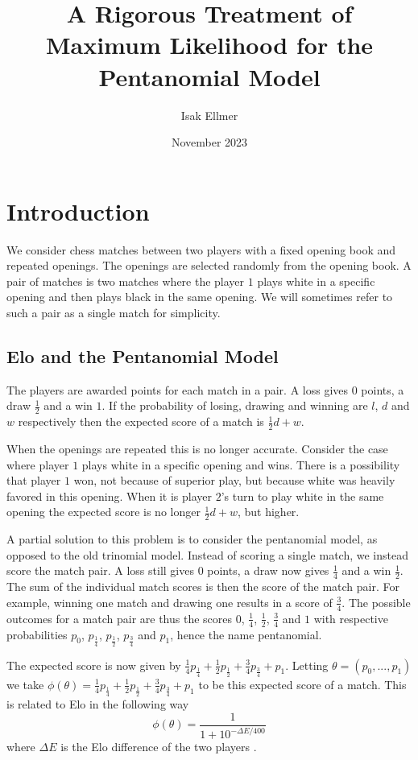 \documentclass{article}
\title{A Rigorous Treatment of Maximum Likelihood for the Pentanomial Model}
\author{Isak Ellmer}
\date{November 2023}
\theoremstyle{plain}
\theoremstyle{definition}
\begin{document}
\maketitle

\section{Introduction}
We consider chess matches between two players with a fixed opening book and repeated openings.
The openings are selected randomly from the opening book. A pair of matches is two matches where
the player $1$ plays white in a specific opening and then plays black in the same opening.
We will sometimes refer to such a pair as a single match for simplicity.

\subsection{Elo and the Pentanomial Model}
The players are awarded points for each match in a pair. A loss gives $0$ points,
a draw $\frac12$ and a win $1$. If the probability of losing, drawing and winning
are $l$, $d$ and $w$ respectively then the expected score of a match is $\frac12d+w$.

When the openings are repeated this is no longer accurate. Consider the case where
player $1$ plays white in a specific opening and wins. There is a possibility that
player $1$ won, not because of superior play, but because white was heavily favored
in this opening. When it is player $2$'s turn to play white in the same opening
the expected score is no longer $\frac12d+w$, but higher.

A partial solution to this problem is to consider the pentanomial model, as opposed to the
old trinomial model. Instead of
scoring a single match, we instead score the match pair. A loss still gives $0$ points,
a draw now gives $\frac14$ and a win $\frac12$. The sum of the individual match scores
is then the score of the match pair. For example, winning one match and drawing one results
in a score of $\frac34$. The possible outcomes for a match pair are thus the scores
$0$, $\frac14$, $\frac12$, $\frac34$ and $1$ with respective probabilities
$p_0$, $p_\frac14$, $p_\frac12$, $p_\frac34$ and $p_1$, hence the name pentanomial. 

The expected score is now given by $\frac14p_\frac14+\frac12p_\frac12+\frac34p_\frac34+p_1$.
Letting $\theta=(p_0,...,p_1)$ we take $\phi(\theta)=\frac14p_\frac14+\frac12p_\frac12+
\frac34p_\frac34+p_1$ to be this expected score of a match.
This is related to Elo in the following way
$$\phi(\theta)=\frac1{1+10^{-\Delta E/400}}$$
where $\Delta E$ is the Elo difference of the two players \cite{wikipedia_elo}.
\end{document}
